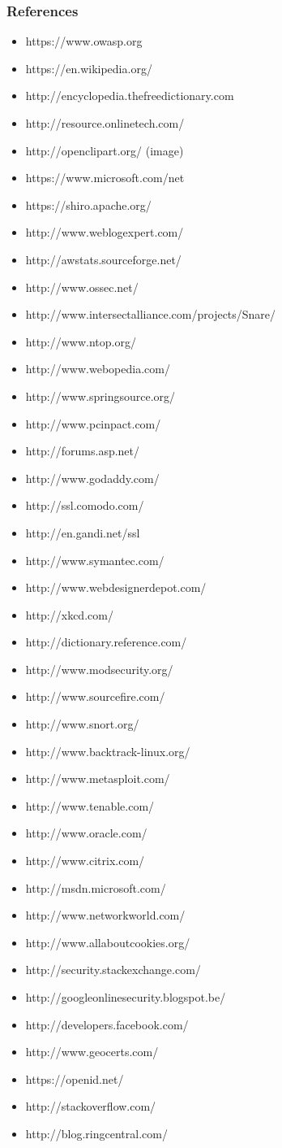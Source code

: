 \begin{frame}
\frametitle{References}
\begin{itemize}
\item https://www.owasp.org
\item https://en.wikipedia.org/
\item http://encyclopedia.thefreedictionary.com
\item http://resource.onlinetech.com/
\item http://openclipart.org/ (image)
\item https://www.microsoft.com/net
\item https://shiro.apache.org/
\item http://www.weblogexpert.com/
\item http://awstats.sourceforge.net/
\item http://www.ossec.net/
\item http://www.intersectalliance.com/projects/Snare/
\item http://www.ntop.org/
\item http://www.webopedia.com/
\item http://www.springsource.org/
\item http://www.pcinpact.com/
\item http://forums.asp.net/
\item http://www.godaddy.com/
\item http://ssl.comodo.com/
\item http://en.gandi.net/ssl
\item http://www.symantec.com/
\item http://www.webdesignerdepot.com/
\item http://xkcd.com/
\item http://dictionary.reference.com/
\item http://www.modsecurity.org/
\item http://www.sourcefire.com/
\item http://www.snort.org/
\item http://www.backtrack-linux.org/
\item http://www.metasploit.com/
\item http://www.tenable.com/
\item http://www.oracle.com/
\item http://www.citrix.com/
\item http://msdn.microsoft.com/
\item http://www.networkworld.com/
\item http://www.allaboutcookies.org/
\item http://security.stackexchange.com/
\item http://googleonlinesecurity.blogspot.be/
\item http://developers.facebook.com/
\item http://www.geocerts.com/
\item https://openid.net/
\item http://stackoverflow.com/
\item http://blog.ringcentral.com/
\end{itemize}
\end{frame}



